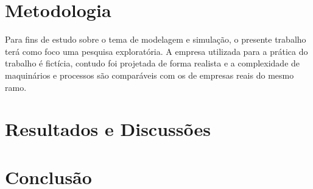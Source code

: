 \documentclass[
	12pt,				%
	openright,			%
	oneside,			%
	a4paper,			%
	english,			%
	french,				%
	spanish,			%
	brazil				%
	]{abntex2}
\begin{document}
\chapter{Metodologia}

Para fins de estudo sobre o tema de modelagem e simulação, o presente trabalho terá como foco uma pesquisa exploratória. A empresa utilizada para a prática do trabalho é fictícia, contudo foi projetada de forma realista e a complexidade de maquinários e processos são comparáveis com os de empresas reais do mesmo ramo. 


\chapter{Resultados e Discussões}



\chapter{Conclusão}




\newpage
\postextual






\end{document}
